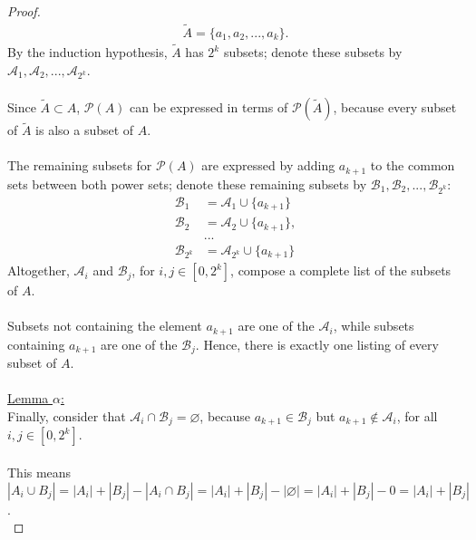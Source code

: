 \documentclass[12pt]{article}
\begin{document}
\begin{proof}
    \begin{equation*}
        \begin{aligned}
            \widetilde{A} = \{a_1, a_2, ..., a_k\}\text{.}
        \end{aligned}
    \end{equation*}
    By the induction hypothesis, $\widetilde{A}$ has $2^k$ subsets; denote these subsets by $\mathcal{A}_1, \mathcal{A}_2, ..., \mathcal{A}_{2^k}$. \\
    \\
    Since $\widetilde{A} \subset A$, $\mathcal{P}(A)$ can be expressed in terms of $\mathcal{P}(\widetilde{A})$, because every subset of $\widetilde{A}$ is also a subset of $A$. \\
    \\
    The remaining subsets for $\mathcal{P}(A)$ are expressed by adding $a_{k+1}$ to the common sets between both power sets; denote these remaining subsets by $\mathcal{B}_1, \mathcal{B}_2, ..., \mathcal{B}_{2^k}$:
    \begin{equation*}
        \begin{aligned}
            \mathcal{B}_1 &= \mathcal{A}_1 \cup \{a_{k+1}\} \\
            \mathcal{B}_2 &= \mathcal{A}_2 \cup \{a_{k+1}\}, \\
            &... \\
            \mathcal{B}_{2^k} &= \mathcal{A}_{2^k} \cup \{a_{k+1}\}
        \end{aligned}
    \end{equation*}
    Altogether, $\mathcal{A}_i$ and $\mathcal{B}_j$, for $i, j \in [0, 2^k]$, compose a complete list of the subsets of $A$. \\
    \\
    Subsets not containing the element $a_{k+1}$ are one of the $\mathcal{A}_i$, while subsets containing $a_{k+1}$ are one of the $\mathcal{B}_j$. Hence, there is exactly one listing of every subset of $A$. \\
    \\
    \underline{Lemma $\alpha$:} \\
    Finally, consider that $\mathcal{A}_i \cap \mathcal{B}_j = \varnothing$, because $a_{k+1} \in \mathcal{B}_j$ but $a_{k+1} \notin \mathcal{A}_i$, for all $i, j \in [0, 2^k]$. \\
    \\
    This means $|A_i \cup B_j| = |A_i| + |B_j| - |A_i \cap B_j| = |A_i| + |B_j| - |\varnothing| = |A_i| + |B_j| - 0 = |A_i| + |B_j|$. \\

\end{proof}
\end{document}
